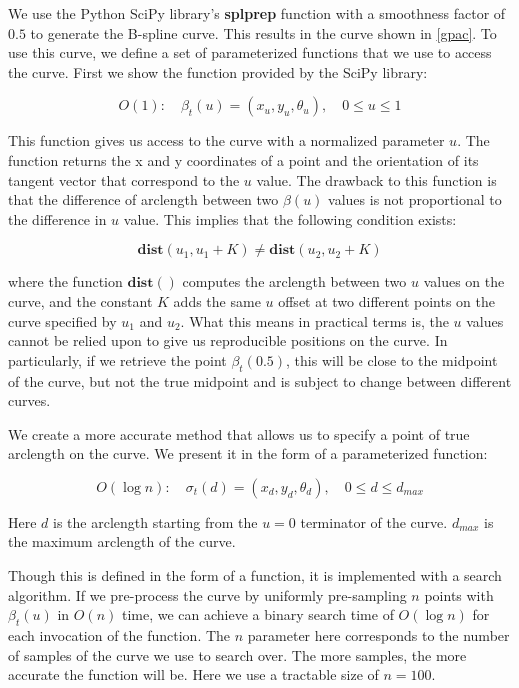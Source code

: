 We use the Python SciPy library's \textbf{splprep} function with a smoothness factor of $0.5$ to generate the B-spline curve. This results in the curve shown in \autoref{gpac}. To use this curve, we define a set of parameterized functions that we use to access the curve. First we show the function provided by the SciPy library:


\begin{equation}
O(1): \quad \beta_t(u) = ( x_u, y_u, \theta_u ),  \quad 0 \leq u \leq 1
\end{equation}


This function gives us access to the curve with a normalized parameter $u$. The function returns the x and y coordinates of a point and the orientation of its tangent vector that correspond to the $u$ value. The drawback to this function is that the difference of arclength between two $\beta(u)$ values is not proportional to the difference in $u$ value. This implies that the following condition exists:


\begin{equation}
\mathbf{dist}(u_1, u_1 + K) \neq \mathbf{dist}(u_2, u_2 + K)  
\end{equation}


where the function $\mathbf{dist}()$ computes the arclength between two $u$ values on the curve, and the constant $K$ adds the same $u$ offset at two different points on the curve specified by $u_1$ and $u_2$. What this means in practical terms is, the $u$ values cannot be relied upon to give us reproducible positions on the curve. In particularly, if we retrieve the point $\beta_t(0.5)$, this will be close to the midpoint of the curve, but not the true midpoint and is subject to change between different curves.

We create a more accurate method that allows us to specify a point of true arclength on the curve. We present it in the form of a parameterized function:


\begin{equation}
\label{equ:arcdist}
O(\log n): \quad \sigma_t(d) = ( x_d, y_d, \theta_d ),  \quad 0 \leq d \leq d_{max}
\end{equation}


Here $d$ is the arclength starting from the $u = 0$ terminator of the curve. $d_{max}$ is the maximum arclength of the curve.

Though this is defined in the form of a function, it is implemented with a search algorithm. If we pre-process the curve by uniformly pre-sampling $n$ points with $\beta_t(u)$ in $O(n)$ time, we can achieve a binary search time of $O(\log n)$ for each invocation of the function. The $n$ parameter here corresponds to the number of samples of the curve we use to search over. The more samples, the more accurate the function will be. Here we use a tractable size of $n = 100$.

